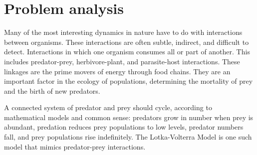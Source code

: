 \chapter{Problem analysis} \label{chap:problemanalysis}


Many of the most interesting dynamics in nature have to do with interactions between organisms. These interactions are often subtle, indirect, and difficult to detect. Interactions in which one organism consumes all or part of another. This includes predator-prey, herbivore-plant, and parasite-host interactions. These linkages are the prime movers of energy through food chains. They are an important factor in the ecology of populations, determining the mortality of prey and the birth of new predators.

A connected system of predator and prey should cycle, according to mathematical models and common sense: predators grow in number when prey is abundant, predation reduces prey populations to low levels, predator numbers fall, and prey populations rise indefinitely. The Lotka-Volterra Model is one such model that mimics predator-prey interactions.









